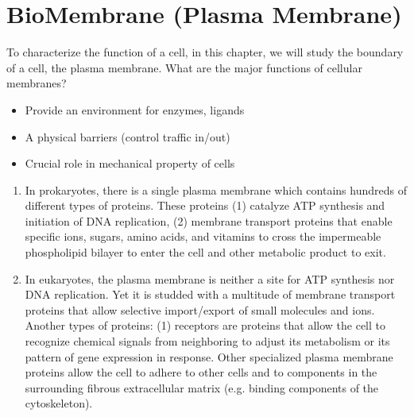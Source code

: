 
\def\ER{{\text{ER}}}

\chapter{BioMembrane (Plasma Membrane)}
\label{chap:membranes}
\label{cha:biom-plasma-membr}



To characterize the function of a cell, in this chapter, we will study
the boundary of a cell, the plasma membrane.  What are the major
functions of cellular membranes?

\begin{itemize}
\item Provide an environment for enzymes, ligands
\item A physical barriers (control traffic in/out)
\item Crucial role in mechanical property of cells
\end{itemize}


\begin{enumerate}
\item In prokaryotes, there is a single plasma membrane which contains
  hundreds of different types of proteins. These proteins (1) catalyze
  ATP synthesis and initiation of DNA replication, (2) membrane
  transport proteins that enable specific ions, sugars, amino acids,
  and vitamins to cross the impermeable phospholipid bilayer to enter
  the cell and other metabolic product to exit.

\item In eukaryotes, the plasma membrane is neither a site for ATP
  synthesis nor DNA replication. Yet it is studded with a multitude of
  membrane transport proteins that allow selective import/export of
  small molecules and ions.  Another types of proteins: (1) receptors
  are proteins that allow the cell to recognize chemical signals from
  neighboring to adjust its metabolism or its pattern of gene
  expression in response. Other specialized plasma membrane proteins
  allow the cell to adhere to other cells and to components in the
  surrounding fibrous extracellular matrix (e.g. binding components of
  the cytoskeleton).
\end{enumerate}

